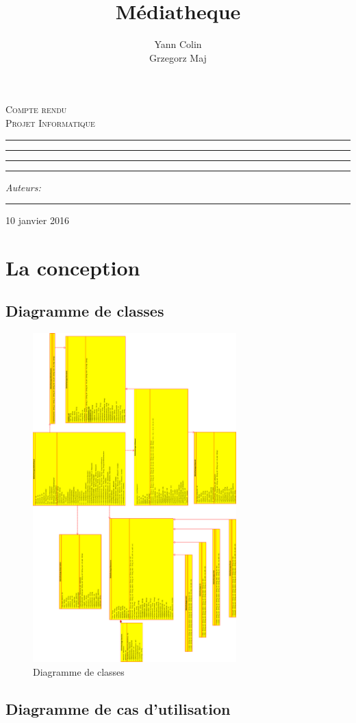 \documentclass[10pt, a4paper]{article}
\author{Yann Colin \\Grzegorz Maj}
\title{Médiatheque}
\makeatletter
\newcommand{\linia}{\rule{\linewidth}{0.4mm}}
\def\maketitle{%
\begin{titlepage}
	\begin{center}
		\LARGE
		\textsc{Compte rendu \\ Projet Informatique}
	\end{center}

	\vspace{3cm}

	\begin{center}\leavevmode
      \hrule
    \vskip 1pt
	\linia
	\vskip 0.5cm
	\Huge \textsc{\@title}\par

	\vskip 0.5cm
      	\linia
      \vskip 1pt
      \hrule

	\vskip 2mm

	\vspace{1.5cm}
	\begin{flushright}
		\begin{minipage}{5cm}
			\textit{\normalsize Auteurs:}\\
			\Large \textit{\@author} \par
			\vskip 2pt
			\hrule
			
		\end{minipage}
	\end{flushright}
    

	\end{center}%
	\vspace*{\stretch{6}}
    \begin{center}
    10 janvier 2016
    \end{center}
\end{titlepage}
	}
\makeatother
\begin{document}

    \maketitle
    
    \tableofcontents
    \newpage
    
     \section{La conception}
     
	     \subsection{Diagramme de classes}
		\begin{figure}[ht]
	    \centering
	    		\includegraphics[width=0.7\textwidth]{graphics/class90.eps}
	    		\caption{Diagramme de classes}
	    		\label{fig:label}
	    	\end{figure}
	    	\newpage
     
    		 \subsection{Diagramme de cas d'utilisation}
    		 
\end{document}

